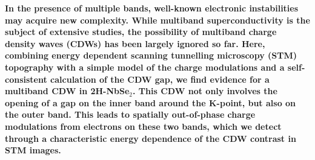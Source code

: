 \documentclass[aps,prl,twocolumn,superscriptaddress]{revtex4-2}
\begin{document}






\maketitle




\textbf{In the presence of multiple bands, well-known electronic instabilities may acquire new complexity. While multiband superconductivity is the subject of extensive studies, the possibility of multiband charge density waves (CDWs) has been largely ignored so far. Here, combining energy dependent scanning tunnelling microscopy (STM) topography with a simple model of the charge modulations and a self-consistent calculation of the CDW gap, we find evidence for a multiband CDW in 2H-NbSe$_2$. This CDW not only involves the opening of a gap on the inner band around the K-point, but also on the outer band. This leads to spatially out-of-phase charge modulations from electrons on these two bands, which we detect through a characteristic energy dependence of the CDW contrast in STM images.}
\end{document}
